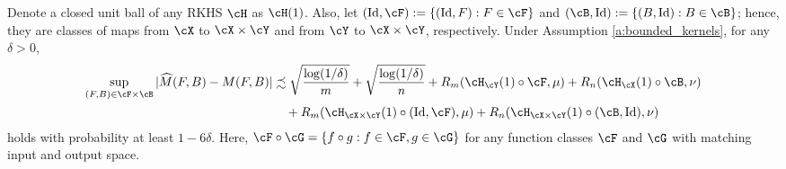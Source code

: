 \documentclass[11pt]{article}
\begin{document}
\begin{proposition}
	\label{prop:uniform-deviation-mmd-term}
	Denote a closed unit ball of any RKHS $\cH$ as $\cH(1)$. Also, let $(\mathrm{Id}, \cF) := \{(\mathrm{Id}, F) : F \in \cF\}$ and $(\cB, \mathrm{Id}) := \{(B, \mathrm{Id}) : B \in \cB\}$; hence, they are classes of maps from $\cX$ to $\cX \times \cY$ and from $\cY$ to $\cX \times \cY$, respectively. Under Assumption \ref{a:bounded_kernels}, for any $\delta > 0$,
	\begin{equation*}
		\begin{split}
			\sup_{(F,B) \in \cF \times \cB} |\widehat{M}(F, B) - M(F, B)|
			& \precsim \sqrt{\frac{\log(1 / \delta)}{m}} + \sqrt{\frac{\log(1 / \delta)}{n}} + R_m(\cH_{\cY}(1) \circ \cF, \mu) + R_n(\cH_{\cX}(1) \circ \cB, \nu) \\
			& \quad + R_m(\cH_{\cX \times \cY}(1) \circ (\mathrm{Id}, \cF), \mu) + R_n(\cH_{\cX \times \cY}(1) \circ (\cB, \mathrm{Id}), \nu)
		\end{split}
	\end{equation*}
	holds with probability at least $1 - 6 \delta$. Here, $\cF \circ \cG = \{f \circ g : f \in \cF, g \in \cG\}$ for any function classes $\cF$ and $\cG$ with matching input and output space.
\end{proposition}
\end{document}

